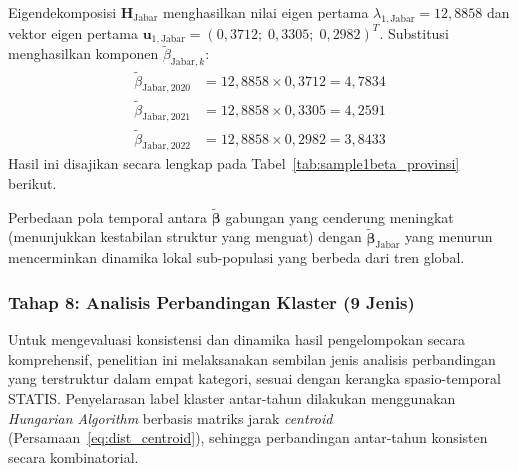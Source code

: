 \begin{enumerate}
    Eigendekomposisi $\mathbf{H}_{\text{Jabar}}$ menghasilkan nilai eigen pertama $\lambda_{1,\text{Jabar}} = 12{,}8858$ dan vektor eigen pertama $\mathbf{u}_{1,\text{Jabar}} = (0{,}3712;\; 0{,}3305;\; 0{,}2982)^T$. Substitusi menghasilkan komponen $\tilde{\beta}_{\text{Jabar}, k}$:
    \begin{align*}
        \tilde{\beta}_{\text{Jabar}, 2020} &= 12{,}8858 \times 0{,}3712 = 4{,}7834 \\
        \tilde{\beta}_{\text{Jabar}, 2021} &= 12{,}8858 \times 0{,}3305 = 4{,}2591 \\
        \tilde{\beta}_{\text{Jabar}, 2022} &= 12{,}8858 \times 0{,}2982 = 3{,}8433
    \end{align*}
    Hasil ini disajikan secara lengkap pada Tabel~\ref{tab:sample1beta_provinsi} berikut.
    
\end{enumerate}

Perbedaan pola temporal antara $\tilde{\boldsymbol{\beta}}$ gabungan yang cenderung meningkat (menunjukkan kestabilan struktur yang menguat) dengan $\tilde{\boldsymbol{\beta}}_{\text{Jabar}}$ yang menurun mencerminkan dinamika lokal sub-populasi yang berbeda dari tren global.

\subsubsection{Tahap 8: Analisis Perbandingan Klaster (9 Jenis)} \label{subsubsec:tahap8bab3}
Untuk mengevaluasi konsistensi dan dinamika hasil pengelompokan secara komprehensif, penelitian ini melaksanakan sembilan jenis analisis perbandingan yang terstruktur dalam empat kategori, sesuai dengan kerangka spasio-temporal STATIS. Penyelarasan label klaster antar-tahun dilakukan menggunakan \textit{Hungarian Algorithm} \citep{kuhn1955} berbasis matriks jarak \textit{centroid} (Persamaan~\ref{eq:dist_centroid}), sehingga perbandingan antar-tahun konsisten secara kombinatorial.

